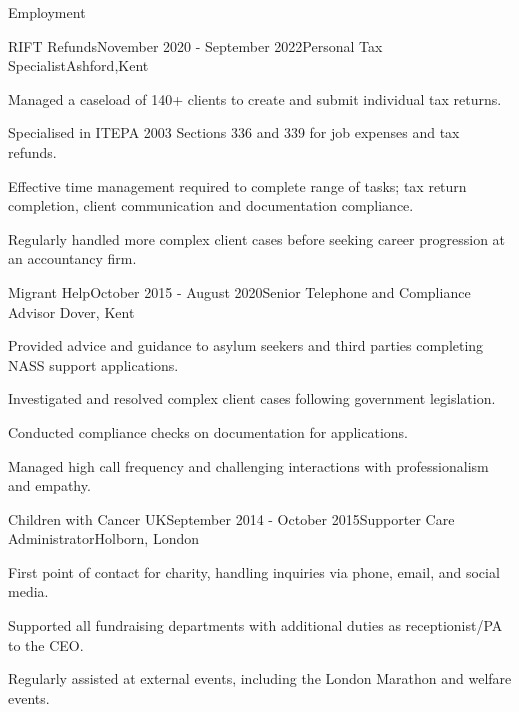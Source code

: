 \documentclass[
	11pt, %
]{resume} %
\begin{document}
\begin{rSection}{Employment}

	\begin{rSubsection}{RIFT Refunds}{November 2020 - September 2022}{Personal Tax Specialist}{Ashford,Kent}
		\item Managed a caseload of 140+ clients to create and submit individual tax returns.
		\item Specialised in ITEPA 2003 Sections 336 and 339 for job expenses and tax refunds. 
		\item Effective time management required to complete range of tasks; tax return completion, client communication and documentation compliance. 
        \item Regularly handled more complex client cases before seeking career progression at an accountancy firm.
	\end{rSubsection}


	\begin{rSubsection}{Migrant Help}{October 2015 - August 2020}{Senior Telephone and Compliance Advisor }{Dover, Kent}
		\item Provided advice and guidance to asylum seekers and third parties completing NASS support applications. 
		\item Investigated and resolved complex client cases following government legislation. 
        \item Conducted compliance checks on documentation for applications.
		\item Managed high call frequency and challenging interactions with professionalism and empathy.
	\end{rSubsection}


	\begin{rSubsection}{Children with Cancer UK}{September 2014 - October 2015}{Supporter Care Administrator}{Holborn, London}
		\item First point of contact for charity, handling inquiries via phone, email, and social media.
		\item Supported all fundraising departments with additional duties as receptionist/PA to the CEO. 
        \item Regularly assisted at external events, including the London Marathon and welfare events.
	\end{rSubsection}
 
\end{rSection}
\end{document}
